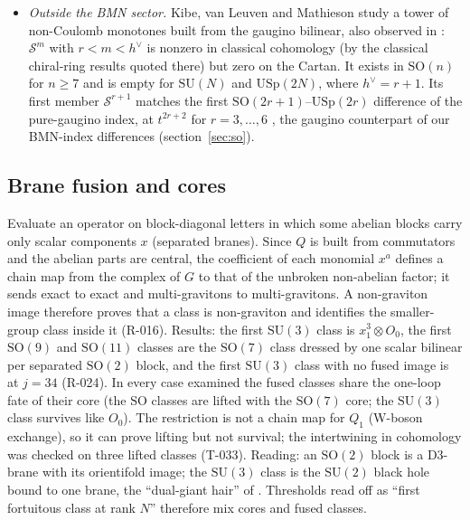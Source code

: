\documentclass[11pt]{article}
\newcommand{\R}[1]{\textsf{R-0#1}}
\newcommand{\T}[1]{\textsf{T-0#1}}
\newcommand{\SU}{\mathrm{SU}}
\newcommand{\SO}{\mathrm{SO}}
\newcommand{\USp}{\mathrm{USp}}
\begin{document}
\begin{itemize}
Cartan \cite[eq.~(6.21)]{KVM}. So every one-loop pair
has a fortuitous source and a non-Coulomb target; Coulomb monotones survive one loop, and a non-Coulomb monotone can
lift only as a target, which needs gauginos or derivatives in both $z_\pm$ directions \cite[sec.~6.1]{KVM}. In particular every BMN
monotone, including $R_{24}^{(0,3)}$ and the other non-Coulomb gravitons above, survives one loop. This proves at one
loop, without the Coulomb-branch assumption, the statement that graviton classes are never sources, which our
analysis had derived from that assumption, and it agrees with our one-loop data: $Q_1$ of every graviton tested is
$Q_0$-exact (\R{20}, \T{30}, \T{31}), and the targets we found ($\SO(7)$, and $P$-odd ones in $\SU(2)$) are
non-Coulomb.
\item \emph{Outside the BMN sector.} Kibe, van Leuven and Mathieson \cite[sec.~4]{KVM} study a tower of non-Coulomb monotones built from the gaugino
bilinear, also observed in \cite{ChoiKim}: $\mathcal S^m$ with $r<m<h^\vee$ is nonzero in classical cohomology (by
the classical chiral-ring results quoted there) but zero on the Cartan. It exists in
$\SO(n)$ for $n\ge7$ and is empty for $\SU(N)$ and $\USp(2N)$, where $h^\vee=r+1$. Its first member
$\mathcal S^{r+1}$ matches the first $\SO(2r+1)$--$\USp(2r)$ difference of the pure-gaugino index, at $t^{2r+2}$ for
$r=3,\dots,6$ \cite[sec.~3, Table~2]{KVM}, the gaugino counterpart of our BMN-index differences (section~\ref{sec:so}).
\end{itemize}

\subsection{Brane fusion and cores}\label{sec:fusion}

Evaluate an operator on block-diagonal letters in which some abelian blocks carry only scalar components $x$
(separated branes). Since $Q$ is built from commutators and the abelian parts are central, the coefficient of each
monomial $x^a$ defines a chain map from the complex of $G$ to that of the unbroken non-abelian factor; it sends exact
to exact and multi-gravitons to multi-gravitons. A non-graviton image therefore proves that a class is non-graviton and
identifies the smaller-group class inside it (\R{16}). Results: the first $\SU(3)$ class is $x_1^3\otimes O_0$, the
first $\SO(9)$ and $\SO(11)$ classes are the $\SO(7)$ class dressed by one scalar bilinear per separated $\SO(2)$
block, and the first $\SU(3)$ class with no fused image is at $j=34$ (\R{24}). In every case examined the fused classes
share the one-loop fate of their core (the $\SO$ classes are lifted with the $\SO(7)$ core; the $\SU(3)$ class
survives like $O_0$). The restriction is not a chain map for $Q_1$ (W-boson exchange), so it can prove lifting but not
survival; the intertwining in cohomology was checked on three lifted classes (\T{33}). Reading: an $\SO(2)$ block is a
D3-brane with its orientifold image; the $\SU(3)$ class is the $\SU(2)$ black hole bound to one brane, the
``dual-giant hair'' of \cite{dMK}. Thresholds read off as ``first fortuitous class at rank $N$'' therefore mix cores
and fused classes.
\end{document}

